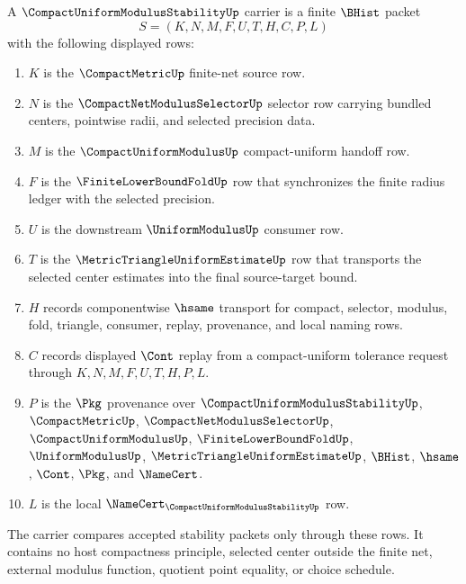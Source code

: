 \begin{definition}
\label{def:compact-uniform-modulus-stability-carrier}
A $\CompactUniformModulusStabilityUp$ carrier is a finite $\BHist$ packet
$$
S=(K,N,M,F,U,T,H,C,P,L)
$$
with the following displayed rows:
\begin{enumerate}
\item $K$ is the $\CompactMetricUp$ finite-net source row.
\item $N$ is the $\CompactNetModulusSelectorUp$ selector row carrying bundled centers, pointwise radii, and selected precision data.
\item $M$ is the $\CompactUniformModulusUp$ compact-uniform handoff row.
\item $F$ is the $\FiniteLowerBoundFoldUp$ row that synchronizes the finite radius ledger with the selected precision.
\item $U$ is the downstream $\UniformModulusUp$ consumer row.
\item $T$ is the $\MetricTriangleUniformEstimateUp$ row that transports the selected center estimates into the final source-target bound.
\item $H$ records componentwise $\hsame$ transport for compact, selector, modulus, fold, triangle, consumer, replay, provenance, and local naming rows.
\item $C$ records displayed $\Cont$ replay from a compact-uniform tolerance request through $K,N,M,F,U,T,H,P,L$.
\item $P$ is the $\Pkg$ provenance over $\CompactUniformModulusStabilityUp$, $\CompactMetricUp$, $\CompactNetModulusSelectorUp$, $\CompactUniformModulusUp$, $\FiniteLowerBoundFoldUp$, $\UniformModulusUp$, $\MetricTriangleUniformEstimateUp$, $\BHist$, $\hsame$, $\Cont$, $\Pkg$, and $\NameCert$.
\item $L$ is the local $\NameCert_{\CompactUniformModulusStabilityUp}$ row.
\end{enumerate}
The carrier compares accepted stability packets only through these rows. It contains no host compactness principle, selected center outside the finite net, external modulus function, quotient point equality, or choice schedule.
\end{definition}

